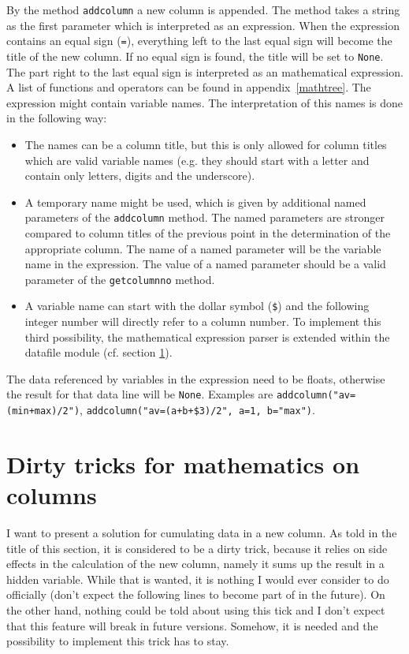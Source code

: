 By the method \verb|addcolumn| a new column is appended. The method
takes a string as the first parameter which is interpreted as an
expression. When the expression contains an equal sign (\verb|=|),
everything left to the last equal sign will become the title of the
new column. If no equal sign is found, the title will be set to
\verb|None|. The part right to the last equal sign is interpreted as
an mathematical expression. A list of functions and operators can be
found in appendix~\ref{mathtree}. The expression might contain
variable names. The interpretation of this names is done in the
following way:
\begin{itemize}
\item The names can be a column title, but this is only allowed for
column titles which are valid variable names (e.g. they should start
with a letter and contain only letters, digits and the underscore).
\item A temporary name might be used, which is given by additional
named parameters of the \verb|addcolumn| method. The named parameters
are stronger compared to column titles of the previous point in the
determination of the appropriate column. The name of a named parameter
will be the variable name in the expression. The value of a named
parameter should be a valid parameter of the \verb|getcolumnno|
method.
\item A variable name can start with the dollar symbol (\verb|$|) and
the following integer number will directly refer to a column number.
To implement this third possibility, the mathematical expression
parser is extended within the datafile module (cf. section
\ref{datafile:cumulate}).
\end{itemize}
The data referenced by variables in the expression need to be
floats, otherwise the result for that data line will be \verb|None|.
Examples are \verb|addcolumn("av=(min+max)/2")|,
\verb|addcolumn("av=(a+b+$3)/2", a=1, b="max")|.

\section{Dirty tricks for mathematics on columns}
\label{datafile:cumulate}

I want to present a solution for cumulating data in a new column.
As told in the title of this section, it is considered to be a dirty
trick, because it relies on side effects in the calculation of the new
column, namely it sums up the result in a hidden variable. While
that is wanted, it is nothing I would ever consider to do officially
(don't expect the following lines to become part of \PyX{} in the
future). On the other hand, nothing could be told about using this
tick and I don't expect that this feature will break in future
versions. Somehow, it is needed and the possibility to implement this
trick has to stay.

